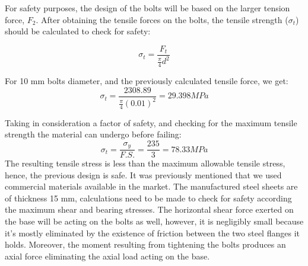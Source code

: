 For safety purposes, the design of the bolts will be based on the larger tension force, $F_{2}$.
After obtaining the tensile forces on the bolts, the tensile strength ($\sigma_{t}$) should be calculated to check for safety:

\begin{equation}
\sigma_{t} = \frac{F_{t}}{\frac{\pi}{4} d^{2}}
\end{equation}

For 10 mm bolts diameter, and the previously calculated tensile force, we get:
$$ \sigma_{t} = \frac{2308.89}{\frac{\pi}{4} (0.01)^{2}} = 29.398 MPa $$ 

Taking in consideration a factor of safety, and checking for the maximum tensile strength the material can undergo before failing:
$$\sigma_{t} = \frac{\sigma_{y}}{F.S.} = \frac{235}{3} = 78.33  MPa$$
The resulting tensile stress is less than the maximum allowable tensile stress, hence, the previous design is safe.
\newline It was previously mentioned that we used commercial materials available in the market. The manufactured steel sheets are of thickness 15 mm, calculations need to be made to check for safety according the maximum shear and bearing stresses.
\newline The horizontal shear force exerted on the base will be acting on the bolts as well, however, it is negligibly small because it’s mostly eliminated by the existence of friction between the two steel flanges it holds. Moreover, the moment resulting from tightening the bolts produces an axial force eliminating the axial load acting on the base.

